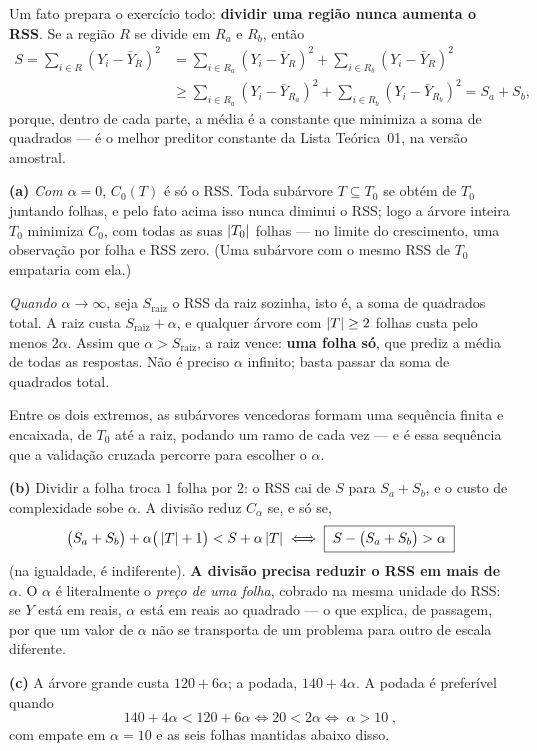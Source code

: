 \begin{solucao}
Um fato prepara o exercício todo: \textbf{dividir uma região nunca aumenta o RSS}. Se
a região $R$ se divide em $R_a$ e $R_b$, então
\[
\begin{aligned}
  S=\sum_{i\in R}(Y_i-\bar Y_R)^2
   &=\sum_{i\in R_a}(Y_i-\bar Y_R)^2+\sum_{i\in R_b}(Y_i-\bar Y_R)^2\\
   &\ge\sum_{i\in R_a}(Y_i-\bar Y_{R_a})^2+\sum_{i\in R_b}(Y_i-\bar Y_{R_b})^2
   =S_a+S_b ,
\end{aligned}
\]
porque, dentro de cada parte, a média é a constante que minimiza a soma de quadrados
--- é o melhor preditor constante da Lista Teórica~01, na versão amostral.

\smallskip
\textbf{(a)} \emph{Com $\alpha=0$}, $C_0(T)$ é só o RSS. Toda subárvore $T\subseteq T_0$
se obtém de $T_0$ juntando folhas, e pelo fato acima isso nunca diminui o RSS; logo a
árvore inteira $T_0$ minimiza $C_0$, com todas as suas $\left\lvert T_0 \right\rvert$ folhas --- no limite
do crescimento, uma observação por folha e RSS zero. (Uma subárvore com o mesmo RSS de
$T_0$ empataria com ela.)

\emph{Quando $\alpha\to\infty$}, seja $S_{\mathrm{raiz}}$ o RSS da raiz sozinha, isto é,
a soma de quadrados total. A raiz custa $S_{\mathrm{raiz}}+\alpha$, e qualquer árvore com
$\left\lvert T \right\rvert\ge2$ folhas custa pelo menos $2\alpha$. Assim que $\alpha>S_{\mathrm{raiz}}$, a
raiz vence: \textbf{uma folha só}, que prediz a média de todas as respostas. Não é
preciso $\alpha$ infinito; basta passar da soma de quadrados total.

Entre os dois extremos, as subárvores vencedoras formam uma sequência finita e
encaixada, de $T_0$ até a raiz, podando um ramo de cada vez --- e é essa sequência que a
validação cruzada percorre para escolher o $\alpha$.

\smallskip
\textbf{(b)} Dividir a folha troca $1$ folha por $2$: o RSS cai de $S$ para $S_a+S_b$, e
o custo de complexidade sobe $\alpha$. A divisão reduz $C_\alpha$ se, e só se,
\[
  \big(S_a+S_b\big)+\alpha\big(\left\lvert T \right\rvert+1\big)<S+\alpha\left\lvert T \right\rvert
  \iff
  \boxed{\;S-\big(S_a+S_b\big)>\alpha\;}
\]
(na igualdade, é indiferente). \textbf{A divisão precisa reduzir o RSS em mais de
$\alpha$}. O $\alpha$ é literalmente o \emph{preço de uma folha}, cobrado na mesma
unidade do RSS: se $Y$ está em reais, $\alpha$ está em reais ao quadrado --- o que
explica, de passagem, por que um valor de $\alpha$ não se transporta de um problema
para outro de escala diferente.

\smallskip
\textbf{(c)} A árvore grande custa $120+6\alpha$; a podada, $140+4\alpha$. A podada é
preferível quando
\[
  140+4\alpha<120+6\alpha
  \iff 20<2\alpha
  \iff \boxed{\;\alpha>10\;},
\]
com empate em $\alpha=10$ e as seis folhas mantidas abaixo disso.


\end{solucao}
